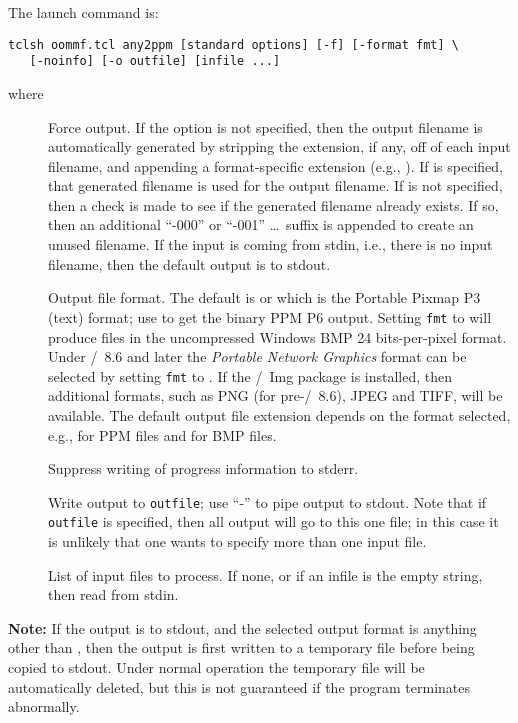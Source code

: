 The  launch command is:
\begin{verbatim}
tclsh oommf.tcl any2ppm [standard options] [-f] [-format fmt] \
   [-noinfo] [-o outfile] [infile ...]
\end{verbatim}
where
\begin{description}
\item[]
  Force output.  If the  option is not specified, then the output
  filename is automatically generated by stripping the extension, if
  any, off of each input filename, and appending a format-specific
  extension (e.g., \fn{.ppm}).  If  is specified, that generated
  filename is used for the output filename.  If \cd{-f} is not
  specified, then a check is made to see if the generated filename
  already exists.  If so, then an additional ``-000'' or ``-001''
  \ldots\ suffix is appended to create an unused filename.  If the input
  is coming from stdin, i.e., there is no input filename, then the
  default output is to stdout.
\item[]
  Output file format.  The default is  or  which is the
  Portable Pixmap P3 (text) format; use \cd{P6} to get the binary PPM P6
  output.  Setting \texttt{fmt} to \cd{BMP} will produce files in the
  uncompressed Windows BMP\index{file!bmp} 24 bits-per-pixel format.
  Under \Tcl/\Tk\ 8.6 and later the \textit{Portable Network Graphics}
  format can be selected by setting \texttt{fmt} to \cd{PNG}.  If the
  \Tcl/\Tk\ Img package is installed, then additional formats, such as
  PNG (for pre-\Tcl/\Tk\ 8.6), JPEG and TIFF, will be available.  The
  default output file extension depends on the format selected, e.g.,
  \fn{.ppm} for PPM files and \fn{.bmp} for BMP files.
\item[]
  Suppress writing of progress information to stderr.
\item[]
  Write output to {\tt outfile}; use ``-'' to pipe output to stdout.
  Note that if {\tt outfile} is specified, then all output will go to
  this one file; in this case it is unlikely that one wants to specify
  more than one input file.
\item[]
  List of input files to process.  If none, or if an infile is the empty
  string, then read from stdin.
\end{description}

\textbf{Note:} If the output is to stdout, and the selected output
format is anything other than \cd{PPM}, then the output is first written
to a temporary file before being copied to stdout.  Under normal
operation the temporary file will be automatically deleted, but this is
not guaranteed if the program terminates abnormally.

